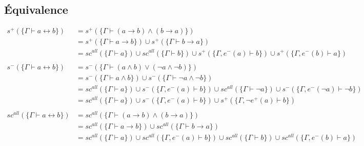 \documentclass[12pt]{article}
\begin{document}
\subsection*{Équivalence}
\begin{align*}
  s^+ (\{\Gamma \vdash a \leftrightarrow b\})      & = s^+ (\{\Gamma \vdash (a \rightarrow b) \land (b \rightarrow a)\})                                                                                                \\
                                                   & = s^+ (\{\Gamma \vdash a \rightarrow b\}) \cup s^+ (\{\Gamma \vdash b \rightarrow a\})                                                                             \\
                                                   & = sc^{all} (\{\Gamma \vdash a\}) \cup sc^{all} (\{\Gamma \vdash b\}) \cup s^+ (\{\Gamma, e^- (a) \vdash b\}) \cup s^+ (\{\Gamma, e^-(b) \vdash a\})                \\
  \\
  s^- (\{\Gamma \vdash a \leftrightarrow b\})      & = s^- (\{\Gamma \vdash (a \land b) \lor (\neg a \land \neg b)\})                                                                                                   \\
                                                   & = s^- (\{\Gamma \vdash a \land b\}) \cup s^- (\{\Gamma \vdash \neg a \land \neg b\})                                                                               \\
                                                   & = sc^{all} (\{\Gamma \vdash a\}) \cup s^- (\{\Gamma, e^-(a) \vdash b\}) \cup sc^{all} (\{\Gamma \vdash \neg a\}) \cup s^- (\{\Gamma, e^- (\neg a) \vdash \neg b\}) \\
                                                   & = sc^{all} (\{\Gamma \vdash a\}) \cup s^- (\{\Gamma, e^-(a) \vdash b\}) \cup s^+ (\{\Gamma, \neg e^+ (a) \vdash b\})                                               \\
  \\
  sc^{all} (\{\Gamma \vdash a \leftrightarrow b\}) & = sc^{all} (\{\Gamma \vdash (a \rightarrow b) \land (b \rightarrow a)\})                                                                                           \\
                                                   & = sc^{all} (\{\Gamma \vdash a \rightarrow b\}) \cup sc^{all} (\{\Gamma \vdash b \rightarrow a\})                                                                   \\
                                                   & = sc^{all} (\{\Gamma \vdash a\}) \cup sc^{all} (\{\Gamma, e^- (a) \vdash b \}) \cup sc^{all} (\{\Gamma \vdash b\}) \cup sc^{all} (\{\Gamma, e^- (b) \vdash a\})    \\
\end{align*}
\end{document}
